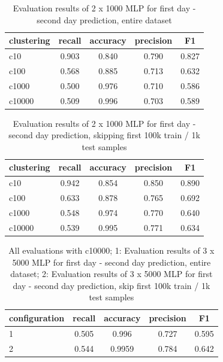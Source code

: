 \begin{table}
    \centering
      \begin{tabular}{lcccc} \toprule{clustering} & {recall} & {accuracy} & {precision} & {F1}  \\ \midrule{c10}  & 0.903 & 0.840 & 0.790 & 0.827 \\
          {c100}  & 0.568 & 0.885 & 0.713 & 0.632 \\
          {c1000}  & 0.500  & 0.976 & 0.710  & 0.586 \\
          {c10000}  & 0.509  & 0.996 &  0.703  & 0.589 \\ \midrule
      \end{tabular}
    \caption{Evaluation results of 2 x 1000 MLP for first day - second day  prediction, entire dataset}
    \label{tab:mytable2}
  \end{table}

\begin{table}
    \centering
      \begin{tabular}{lcccc} \toprule{clustering} & {recall} & {accuracy} & {precision} & {F1}  \\ \midrule{c10}  & 0.942  & 0.854 & 0.850  &  0.890 \\ 
          {c100}  & 0.633  & 0.878 & 0.765  &  0.692 \\ 
          {c1000}  & 0.548  & 0.974 & 0.770  &  0.640 \\ 
          {c10000}  &  0.539  & 0.995 & 0.771  &  0.634 \\ \midrule
          
      \end{tabular}
    \caption{Evaluation results of 2 x 1000 MLP for first day - second day  prediction, skipping first 100k train / 1k test samples}  \label{tab:mytable1}
  \end{table}
  
  \begin{table}
    \centering
      \begin{tabular}{lcccc} \toprule{configuration} & {recall} & {accuracy} & {precision} & {F1}  \\ \midrule{1}  & 0.505  & 0.996 &  0.727  & 0.595 \\
          {2} & 0.544  & 0.9959 &  0.784  & 0.642 \\  \midrule
      \end{tabular}
    \caption{All evaluations with c10000; 1: Evaluation results of 3 x 5000 MLP for first day - second day  prediction, entire dataset; 2: Evaluation results of 3 x 5000 MLP for first day - second day prediction, skip first 100k train / 1k test samples}
    \label{tab:mytable3}
  \end{table}

